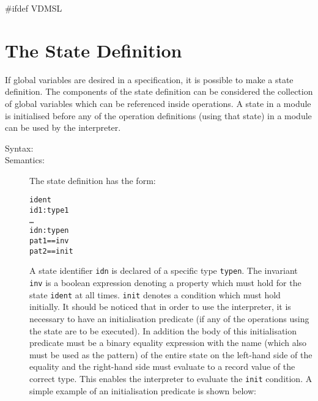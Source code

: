 \documentclass[\pformat,12pt]{article}
\begin{document}
#ifdef VDMSL
\section{The State Definition}\label{statedef}

If global variables are desired in a specification, it is possible to make
a state definition. The components of the state definition can be
considered the collection of global variables which can be referenced
inside operations. A state in a module is initialised before any of the
operation definitions (using that state) in a module can be used by
the interpreter.

\begin{description}
\item[Syntax:]




\item[Semantics:] The state definition has the form:
  \begin{alltt}
     ident 
      id1 : type1
      \ldots
      idn : typen
      pat1 == inv
     pat2 == init
  \end{alltt}
  A state identifier {\tt idn} is declared of a specific type {\tt typen}.
  The invariant {\tt inv} is a boolean expression denoting a
  property which must hold for the state {\tt ident} at all
  times. {\tt init} denotes a condition which must hold initially.
  It should be noticed that in order to use the
  interpreter, it is
  necessary to have an initialisation predicate (if any of the
  operations using the state are to be executed). In addition the body of
  this initialisation predicate must be a binary equality expression with
  the name (which also must be used as the pattern) of the entire state on
  the left-hand side of the equality and the right-hand side must evaluate
  to a record value of the correct type. This enables the interpreter
  to evaluate the {\tt init} condition. A simple example of an
  initialisation predicate is shown below:


\end{description}
\end{document}
